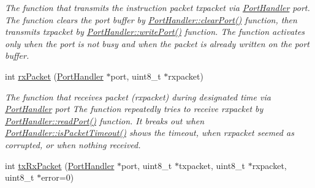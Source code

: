 \begin{DoxyCompactItemize}
\begin{DoxyCompactList}\small\item\em The function that transmits the instruction packet txpacket via \hyperlink{classmercury_1_1_port_handler}{Port\+Handler} port.  The function clears the port buffer by \hyperlink{classmercury_1_1_port_handler_accf37c8838c1ce3042a0127ceeb89c48}{Port\+Handler\+::clear\+Port()} function,  then transmits txpacket by \hyperlink{classmercury_1_1_port_handler_ad26c3a106d6b668b6fae3d2f0afeab9e}{Port\+Handler\+::write\+Port()} function.  The function activates only when the port is not busy and when the packet is already written on the port buffer. \end{DoxyCompactList}\item 
int \hyperlink{classmercury_1_1_protocol_packet_handler_a4d124ca43f6a2178497eaaabb9e5907b}{rx\+Packet} (\hyperlink{classmercury_1_1_port_handler}{Port\+Handler} $\ast$port, uint8\+\_\+t $\ast$rxpacket)
\begin{DoxyCompactList}\small\item\em The function that receives packet (rxpacket) during designated time via \hyperlink{classmercury_1_1_port_handler}{Port\+Handler} port  The function repeatedly tries to receive rxpacket by \hyperlink{classmercury_1_1_port_handler_afa6f52d7b95c5ffd8f0c92477d517c79}{Port\+Handler\+::read\+Port()} function.  It breaks out  when \hyperlink{classmercury_1_1_port_handler_a6733438255ede3d34738842e10cd8fc2}{Port\+Handler\+::is\+Packet\+Timeout()} shows the timeout,  when rxpacket seemed as corrupted, or  when nothing received. \end{DoxyCompactList}\item 
int \hyperlink{classmercury_1_1_protocol_packet_handler_a68b02f23af616886d0795ea12debd613}{tx\+Rx\+Packet} (\hyperlink{classmercury_1_1_port_handler}{Port\+Handler} $\ast$port, uint8\+\_\+t $\ast$txpacket, uint8\+\_\+t $\ast$rxpacket, uint8\+\_\+t $\ast$error=0)

\end{DoxyCompactItemize}
